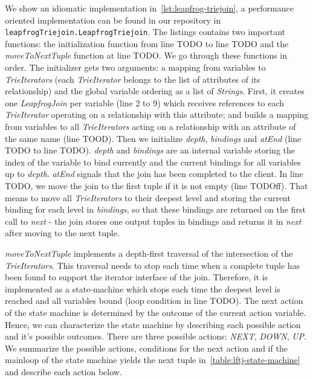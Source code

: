 We show an idiomatic implementation in~\cref{lst:leapfrog-triejoin}, a performance oriented implementation can be found in our
repository in \texttt{leapfrogTriejoin.LeapfrogTriejoin}.
The listings contains two important functions: the initialization function from line TODO to line TODO %
and the \textit{moveToNextTuple} function at line TODO. %
We go through these functions in order.
The initializer gets two arguments: a mapping from variables to \textit{TrieIterators} (each \textit{TrieIterator} belongs to
the list of attributes of its relationship) and the global variable ordering as a list of \textit{Strings}.
First, it creates one \textit{LeapfrogJoin} per variable (line 2 to 9) which receives references %
to each \textit{TrieIterator} operating on a relationship with this attribute; and builds a mapping from variables to
all \textit{TrieIterators} acting on a relationship with an attribute of the same name (line TOOD). %
Then we initialize \textit{depth}, \textit{bindings} and \textit{atEnd} (line TODO to line TODO). %
\textit{depth} and \textit{bindings} are an internal variable storing the index of the variable to bind currently and the
current bindings for all variables up to \textit{depth}.
\textit{atEnd} signals that the join has been completed to the client.
In line TODO, we move the join to the first tuple if it is not empty (line TODOff). %
That means to move all \textit{TrieIterators} to their deepest level and storing the current binding for each level
in \textit{bindings}, so that these bindings are returned on the first call to \textit{next} - the join stores one output
tuples in bindings and returns it in \textit{next} after moving to the next tuple. %

\textit{moveToNextTuple} implements a depth-first traversal of the intersection of the \textit{TrieIterators}.
This traversal needs to stop each time when a complete tuple has been found to support the iterator interface of the join.
Therefore, it is implemented as a state-machine which stops each time the deepest level is reached and all variables bound
(loop condition in line TODO). %
The next action of the state machine is determined by the outcome of the current action variable.
Hence, we can characterize the state machine by describing each possible action and it's possible outcomes.
There are three possible actions: \textit{NEXT}, \textit{DOWN}, \textit{UP}.
We summarize the possible actions, conditions for the next action and
if the mainloop of the state machine yields the next tuple in~\cref{table:lftj-state-machine} and describe each action below.

